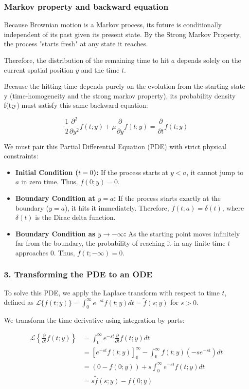 \documentclass{beamer}
\begin{document}
\begin{frame}
\frametitle{Markov property and backward equation}
Because Brownian motion is a Markov process, its future is conditionally independent of its past given its present state. By the Strong Markov Property, the process "starts fresh" at any state it reaches. 

\vspace{0.2cm}

Therefore, the distribution of the remaining time to hit $a$ depends solely on the current spatial position $y$ and the time $t$.

\vspace{0.2cm}

Because the hitting time depends purely on the evolution from the starting state 
y (time-homogeneity and the strong markov property), its probability density f(t;y) must satisfy this same backward equation:

\[
\frac{1}{2} \frac{\partial^2}{\partial y^2} f(t;y) + \mu \frac{\partial}{\partial y} f(t;y) = \frac{\partial}{\partial t} f(t;y)
\]
\end{frame}

\begin{frame}
We must pair this Partial Differential Equation (PDE) with strict physical constraints:

\begin{itemize}
  \item \textbf{Initial Condition ($t = 0$):} If the process starts at $y < a$, it cannot jump to $a$ in zero time. Thus, $f(0; y) = 0$.
  \item \textbf{Boundary Condition at $y = a$:} If the process starts exactly at the boundary ($y = a$), it hits it immediately. Therefore, $f(t; a) = \delta(t)$, where $\delta(t)$ is the Dirac delta function.
  \item \textbf{Boundary Condition as $y \rightarrow -\infty$:} As the starting point moves infinitely far from the boundary, the probability of reaching it in any finite time $t$ approaches $0$. Thus, $f(t; -\infty) = 0$.
\end{itemize}
\end{frame}

\begin{frame}
\frametitle{3. Transforming the PDE to an ODE}
To solve this PDE, we apply the Laplace transform with respect to time $t$, defined as $\mathcal{L}\{f(t; y)\} = \int_0^\infty e^{-st} f(t; y) dt = \tilde{f}(s; y)$ for $s > 0$.

We transform the time derivative using integration by parts:

\[
\begin{aligned}
\mathcal{L} \left\{ \frac{\partial}{\partial t} f(t;y) \right\} &= \int_{0}^{\infty} e^{-st} \frac{\partial}{\partial t} f(t;y) dt \\
&= \left[ e^{-st} f(t;y) \right]_{0}^{\infty} - \int_{0}^{\infty} f(t;y) (-s e^{-st}) dt \\
&= (0 - f(0;y)) + s \int_{0}^{\infty} e^{-st} f(t;y) dt \\
&= s\tilde{f}(s;y) - f(0;y)
\end{aligned}
\]
\end{frame}
\end{document}
